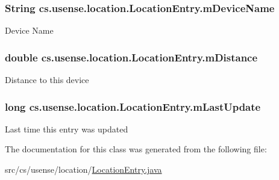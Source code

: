 \subsubsection[{m\+Device\+Name}]{\setlength{\rightskip}{0pt plus 5cm}String cs.\+usense.\+location.\+Location\+Entry.\+m\+Device\+Name\hspace{0.3cm}{\ttfamily [private]}}\label{classcs_1_1usense_1_1location_1_1_location_entry_a5635a875425bd75e79e3bb0c986ea387}
Device Name \hypertarget{classcs_1_1usense_1_1location_1_1_location_entry_aec160f380f13be547cc37a7eb4b1f8f2}{}
\subsubsection[{m\+Distance}]{\setlength{\rightskip}{0pt plus 5cm}double cs.\+usense.\+location.\+Location\+Entry.\+m\+Distance\hspace{0.3cm}{\ttfamily [private]}}\label{classcs_1_1usense_1_1location_1_1_location_entry_aec160f380f13be547cc37a7eb4b1f8f2}
Distance to this device \hypertarget{classcs_1_1usense_1_1location_1_1_location_entry_a77f985e5085d7440066c966de2d7c794}{}
\subsubsection[{m\+Last\+Update}]{\setlength{\rightskip}{0pt plus 5cm}long cs.\+usense.\+location.\+Location\+Entry.\+m\+Last\+Update\hspace{0.3cm}{\ttfamily [private]}}\label{classcs_1_1usense_1_1location_1_1_location_entry_a77f985e5085d7440066c966de2d7c794}
Last time this entry was updated 

The documentation for this class was generated from the following file\+:\begin{DoxyCompactItemize}
\item 
src/cs/usense/location/\hyperlink{_location_entry_8java}{Location\+Entry.\+java}\end{DoxyCompactItemize}
